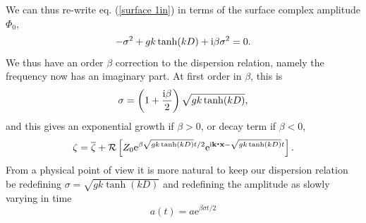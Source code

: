  We can thus re-write eq. (\ref{surface 1in}) in terms of the surface complex amplitude $\Phi_0$,
\begin{equation}
    -\sigma^2 + g k \tanh (kD)+\mathrm{i} \beta \sigma^2 =0.\label{disp_in}
\end{equation}
We thus have an order $\beta$ correction to the dispersion relation, namely the frequency now has an imaginary part.  At first order in $\beta$, this is 
\begin{equation}
    \sigma= \left(1+\frac{\mathrm{i} \beta}{2}\right)\sqrt{g k \tanh (kD)},\label{disp_in}
\end{equation}
and  this gives an exponential growth if $\beta > 0$,   or decay term  if $\beta < 0$, 
\begin{equation}
    \zeta= \overline{\zeta} + {\cal R} \left[ Z_0 \mathrm{e}^{\beta \sqrt{g k \tanh (kD)}  t/2}  \mathrm{e}^{\mathrm{i}{\mathbf k}\mbox{\boldmath $\cdot$}{\mathbf x} - \sqrt{g k \tanh (kD)}  t} \right].
\end{equation}
From a physical point of view it is more natural to keep our dispersion relation be redefining $\sigma=\sqrt{g k \tanh (kD)}$ and redefining the amplitude as slowly varying in time
\begin{equation}
a(t)= a \mathrm{e}^{\beta \sigma t/2} 
\end{equation}

